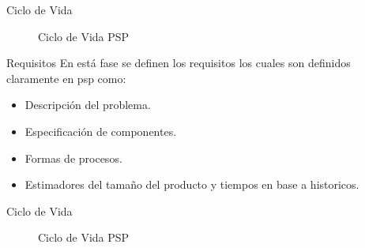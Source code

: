 \documentclass[]{beamer}
\begin{document}
			\begin{frame}{Ciclo de Vida}
				\begin{figure}								
					 \caption{Ciclo de Vida PSP}
				\end{figure}			
			\end{frame}
			
			\begin{frame}{Requisitos}
				En está fase se definen los requisitos los cuales son definidos claramente en psp como:
					\begin{itemize}
						\item Descripción del problema.
						\item Especificación de componentes.
						\item Formas de procesos.
						\item Estimadores del tamaño del producto y tiempos en base a historicos.
					\end{itemize}
			\end{frame}					
			
			\begin{frame}{Ciclo de Vida}
				\begin{figure}								
					 \caption{Ciclo de Vida PSP}
				\end{figure}			
			\end{frame}						
			
\end{document}
